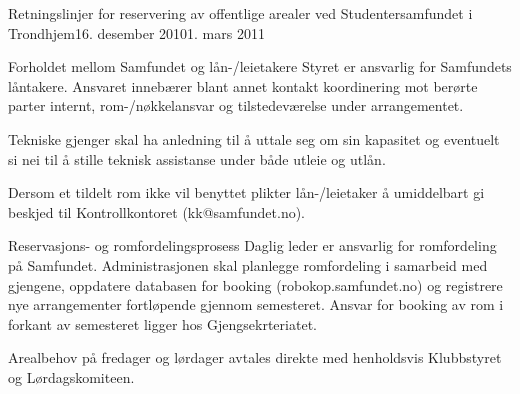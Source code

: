 \begin{instruks}{Retningslinjer for reservering av offentlige arealer
    ved Studentersamfundet i Trondhjem}{16. desember 2010}{1. mars 2011}
\begin{instruksledd}{Forholdet mellom Samfundet og lån-/leietakere}
        Styret er ansvarlig for Samfundets låntakere. Ansvaret innebærer blant annet
        kontakt koordinering mot berørte parter
        internt, rom-/nøkkelansvar og tilstedeværelse under arrangementet.

        Tekniske gjenger skal ha anledning til å uttale seg om sin kapasitet og
        eventuelt si nei til å stille teknisk assistanse
        under både utleie og utlån.

        Dersom et tildelt rom ikke vil benyttet plikter lån-/leietaker å umiddelbart
        gi beskjed til Kontrollkontoret (kk@samfundet.no).
    \end{instruksledd}

    \begin{instruksledd}{Reservasjons- og romfordelingsprosess}
        Daglig leder er ansvarlig for romfordeling på Samfundet. Administrasjonen skal
        planlegge romfordeling i samarbeid
        med gjengene, oppdatere databasen for booking (robokop.samfundet.no) og
        registrere nye arrangementer fortløpende
        gjennom semesteret. Ansvar for booking av rom i forkant av semesteret ligger
        hos Gjengsekrteriatet.


        Arealbehov på fredager og lørdager avtales direkte med henholdsvis Klubbstyret
        og Lørdagskomiteen.


\end{instruksledd}
\end{instruks}
